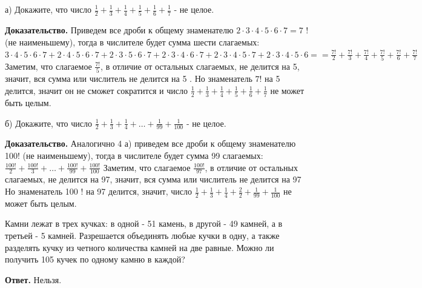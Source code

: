 а) Докажите, что число $\frac{1}{2}+\frac{1}{3}+\frac{1}{4}+\frac{1}{5}+\frac{1}{6}+\frac{1}{7}$ - не целое.

\textbf{Доказательство.} Приведем все дроби к общему знаменателю $2 \cdot 3 \cdot 4 \cdot 5 \cdot 6 \cdot 7=7$ ! (не наименьшему), тогда в числителе будет сумма шести слагаемых: $3 \cdot 4 \cdot 5 \cdot 6 \cdot 7+2 \cdot 4 \cdot 5 \cdot 6 \cdot 7+2 \cdot 3 \cdot 5 \cdot 6 \cdot 7+2 \cdot 3 \cdot 4 \cdot 6 \cdot 7+2 \cdot 3 \cdot 4 \cdot 5 \cdot 7+2 \cdot 3 \cdot 4 \cdot 5 \cdot 6= =\frac{7!}{2}+\frac{7!}{3}+\frac{7!}{4}+\frac{7!}{5}+\frac{7!}{6}+\frac{7!}{7}$ Заметим, что слагаемое $\frac{7!}{5}$, в отличие от остальных слагаемых, не делится на 5, значит, вся сумма или числитель не делится на 5 . Но знаменатель $7!$ на 5 делится, значит он не сможет сократится и число $\frac{1}{2}+\frac{1}{3}+\frac{1}{4}+\frac{1}{5}+\frac{1}{6}+\frac{1}{7}$ не может быть целым.

б) Докажите, что число $\frac{1}{2}+\frac{1}{3}+\frac{1}{4}+\ldots+\frac{1}{99}+\frac{1}{100}$ - не целое.

\textbf{Доказательство.} Аналогично 4 а) приведем все дроби к общему знаменателю 100! (не наименьшему), тогда в числителе будет сумма 99 слагаемых: $\frac{100!}{2}+\frac{100!}{3}+\ldots+\frac{100!}{99}+\frac{100!}{100}$ Заметим, что слагаемое $\frac{100!}{97}$, в отличие от остальных слагаемых, не делится на 97, значит, вся сумма или числитель не делится на 97 Но знаменатель 100 ! на 97 делится, значит, число $\frac{1}{2}+\frac{1}{3}+\frac{1}{4}+\frac{2}{2}+\frac{1}{99}+\frac{1}{100}$ не может быть целым.

Камни лежат в трех кучках: в одной - 51 камень, в другой - 49 камней, а в третьей - 5 камней. Разрешается объединять любые кучки в одну, а также разделять кучку из четного количества камней на две равные. Можно ли получить 105 кучек по одному камню в каждой?

\textbf{Ответ.} Нельзя.


